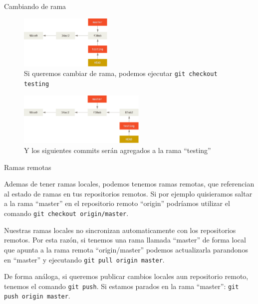 \documentclass{beamer}
\begin{document}
\begin{frame}{Cambiando de rama}

    \begin{figure}[ht]
        \begin{center}
            \includegraphics[height=1in]{images/head-to-testing.png}
        \end{center}
        \caption{Si queremos cambiar de rama, podemos ejecutar \texttt{git checkout testing}}
    \end{figure}
    \begin{figure}[ht]
        \begin{center}
            \includegraphics[height=1in]{images/advance-testing.png}
        \end{center}
        \caption{Y los siguientes commits serán agregados a la rama ``testing''}
    \end{figure}

\end{frame}

\begin{frame}{Ramas remotas}

    Ademas de tener ramas locales, podemos tenemos ramas remotas, que referencian al estado de ramas en tus repositorios remotos.
    Si por ejemplo quisieramos saltar a la rama ``master'' en el repositorio remoto ``origin'' podríamos utilizar el comando \texttt{git checkout origin/master}.

    \vspace{1em}

    Nuestras ramas locales no sincronizan automaticamente con los repositorios remotos. Por esta razón, si tenemos una rama llamada ``master'' de forma local que
    apunta a la rama remota ``origin/master'' podemos actualizarla parandonos en ``master'' y ejecutando \texttt{git pull origin master}.

    \vspace{1em}

    De forma análoga, si queremos publicar cambios locales aun repositorio remoto, tenemos el comando \texttt{git push}. Si estamos parados en la rama ``master'':
    \texttt{git push origin master}.

\end{frame}
\end{document}
